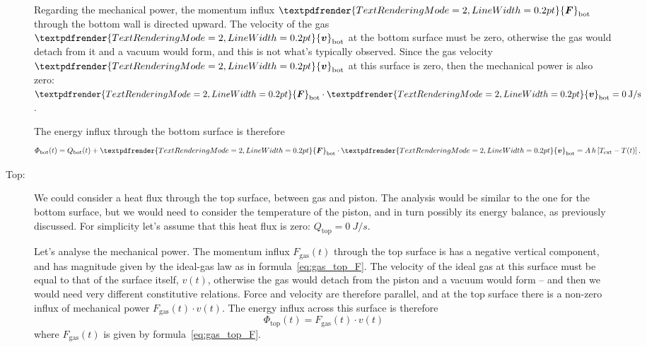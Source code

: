 \documentclass[a4paper,12pt,%
onecolumn,oneside,%
british%
]{memoir}
\renewcommand*{\bm}[1]{\textpdfrender{TextRenderingMode=2,LineWidth=0.2pt}{\boldsymbol{#1}}}
\newcommand*{\di}{\mathrm{d}}%
\renewcommand*{\|}[1][]{\nonscript\:#1\vert\nonscript\:\mathopen{}}
\newcommand*{\yvis}{\mu} %
\newcommand*{\yhea}{h} %
\newcommand*{\yv}{\bm{v}}
\newcommand*{\dt}{\di t}
\newcommand*{\yN}{N}
\newcommand*{\yH}{\varPhi}%
\newcommand*{\yQ}{Q}%
\newcommand*{\yF}{\bm{F}}
\newcommand*{\yFgas}{F_{\textrm{gas}}}
\newcommand*{\ypr}{p} %
\newcommand*{\yT}{T}%
\newcommand*{\yTe}{\yT_{\text{ext}}}%
\begin{document}
\begin{description}
  Regarding the mechanical power, the momentum influx $\yF_{\textrm{bot}}$ through the bottom wall is directed upward. The velocity of the gas $\yv_{\textrm{bot}}$ at the bottom surface must be zero, otherwise the gas would detach from it and a vacuum would form, and this is not what's typically observed. Since the gas velocity $\yv_{\textrm{bot}}$ at this surface is zero, then the mechanical power is also zero: $\yF_{\textrm{bot}} \cdot \yv_{\textrm{bot}} = \qty{0}{J/s}$.

  The energy influx through the bottom surface is therefore
  \begin{equation*}
    \yH_{\textrm{bot}}(t) = \yQ_{\textrm{bot}}(t)
    + \yF_{\textrm{bot}} \cdot \yv_{\textrm{bot}}
    = A\,\yhea\,[\yTe-\yT(t)] \,.
  \end{equation*}

\item[Top:] We could consider a heat flux through the top surface, between gas and piston. The analysis would be similar to the one for the bottom surface, but we would need to consider the temperature of the piston, and in turn possibly its energy balance, as previously discussed. For simplicity let's assume that this heat flux is zero: $\yQ_{\text{top}} = \qty{0}{J/s}$.

  Let's analyse the mechanical power. The momentum influx $\yFgas(t)$ through the top surface is has a negative vertical component, and has magnitude given by the ideal-gas law as in formula~\eqref{eq:gas_top_F}. The velocity of the ideal gas at this surface must be equal to that of the surface itself, $v(t)$, otherwise the gas would detach from the piston and a vacuum would form -- and then we would need very different constitutive relations. Force and velocity are therefore parallel, and at the top surface there is a non-zero influx of mechanical power $\yFgas(t)\cdot v(t)$. The energy influx across this surface is therefore
  \begin{equation*}
    \yH_{\textrm{top}}(t) = \yFgas(t)\cdot v(t)
  \end{equation*}
where $\yFgas(t)$ is given by formula~\eqref{eq:gas_top_F}.
\end{description}
\end{document}
